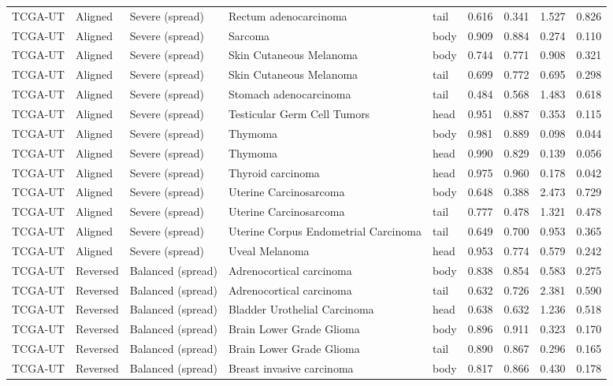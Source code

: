 \begin{longtable}{lllllrrrr}
TCGA-UT & Aligned & Severe (spread) & Rectum adenocarcinoma & tail & 0.616 & 0.341 & 1.527 & 0.826 \\
TCGA-UT & Aligned & Severe (spread) & Sarcoma & body & 0.909 & 0.884 & 0.274 & 0.110 \\
TCGA-UT & Aligned & Severe (spread) & Skin Cutaneous Melanoma & body & 0.744 & 0.771 & 0.908 & 0.321 \\
TCGA-UT & Aligned & Severe (spread) & Skin Cutaneous Melanoma & tail & 0.699 & 0.772 & 0.695 & 0.298 \\
TCGA-UT & Aligned & Severe (spread) & Stomach adenocarcinoma & tail & 0.484 & 0.568 & 1.483 & 0.618 \\
TCGA-UT & Aligned & Severe (spread) & Testicular Germ Cell Tumors & head & 0.951 & 0.887 & 0.353 & 0.115 \\
TCGA-UT & Aligned & Severe (spread) & Thymoma & body & 0.981 & 0.889 & 0.098 & 0.044 \\
TCGA-UT & Aligned & Severe (spread) & Thymoma & head & 0.990 & 0.829 & 0.139 & 0.056 \\
TCGA-UT & Aligned & Severe (spread) & Thyroid carcinoma & head & 0.975 & 0.960 & 0.178 & 0.042 \\
TCGA-UT & Aligned & Severe (spread) & Uterine Carcinosarcoma & body & 0.648 & 0.388 & 2.473 & 0.729 \\
TCGA-UT & Aligned & Severe (spread) & Uterine Carcinosarcoma & tail & 0.777 & 0.478 & 1.321 & 0.478 \\
TCGA-UT & Aligned & Severe (spread) & Uterine Corpus Endometrial Carcinoma & tail & 0.649 & 0.700 & 0.953 & 0.365 \\
TCGA-UT & Aligned & Severe (spread) & Uveal Melanoma & head & 0.953 & 0.774 & 0.579 & 0.242 \\
TCGA-UT & Reversed & Balanced (spread) & Adrenocortical carcinoma & body & 0.838 & 0.854 & 0.583 & 0.275 \\
TCGA-UT & Reversed & Balanced (spread) & Adrenocortical carcinoma & tail & 0.632 & 0.726 & 2.381 & 0.590 \\
TCGA-UT & Reversed & Balanced (spread) & Bladder Urothelial Carcinoma & head & 0.638 & 0.632 & 1.236 & 0.518 \\
TCGA-UT & Reversed & Balanced (spread) & Brain Lower Grade Glioma & body & 0.896 & 0.911 & 0.323 & 0.170 \\
TCGA-UT & Reversed & Balanced (spread) & Brain Lower Grade Glioma & tail & 0.890 & 0.867 & 0.296 & 0.165 \\
TCGA-UT & Reversed & Balanced (spread) & Breast invasive carcinoma & body & 0.817 & 0.866 & 0.430 & 0.178 \\

\end{longtable}
